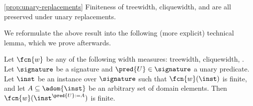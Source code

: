 \newcommand{\cwdec}{\mathrm{Dec}(\cols, \mathrm{Cnst}, \Sigma)}
\newcommand{\hcwdec}{\mathrm{Dec}(\cols, \mathrm{Cnst})}
\newcommand{\wdt}{\mathcal{T}}

\begin{customobs}{\ref{prop:unary-replacements}}
Finiteness of treewidth, cliquewidth, and \hypercliquewidth{} are all preserved under unary replacements.
\end{customobs}

We reformulate the above result into the following (more explicit) technical lemma, which we prove afterwards.

\begin{lemma}
Let $\fcn{w}$ be any of the following width measures: treewidth, cliquewidth, \ercwidth{}. Let $\signature$ be a signature and $\pred{U} \in \signature$ a unary predicate. Let $\inst$ be an instance over $\signature$ such that $\fcn{w}(\inst)$ is finite, and let $A \subseteq \adom{\inst}$ be an arbitrary set of domain elements. Then $\fcn{w}(\inst^{\pred{U}:=A})$ is finite.
\end{lemma}
